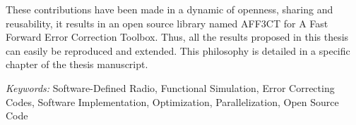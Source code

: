 These contributions have been made in a dynamic of openness, sharing and
reusability, it results in an open source library named AFF3CT for A Fast
Forward Error Correction Toolbox. Thus, all the results proposed in this thesis
can easily be reproduced and extended. This philosophy is detailed in a specific
chapter of the thesis manuscript.

\vskip0.5cm
\emph{Keywords:} Software-Defined Radio, Functional Simulation, Error
                 Correcting Codes, Software Implementation, Optimization,
                 Parallelization, Open Source Code
